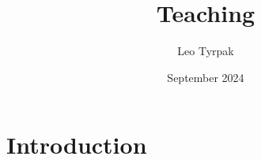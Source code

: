 \documentclass{article}
\title{Teaching}
\author{Leo Tyrpak}
\date{September 2024}
\begin{document}
\maketitle

\section{Introduction}
\end{document}
